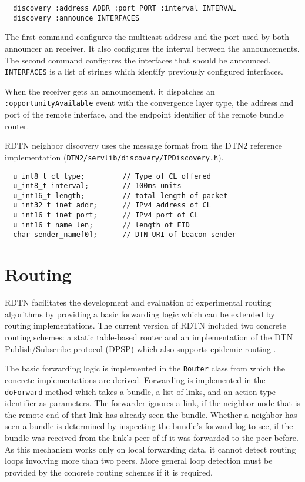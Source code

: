 \documentclass{article}
\begin{document}
\begin{verbatim}
  discovery :address ADDR :port PORT :interval INTERVAL
  discovery :announce INTERFACES
\end{verbatim}

The first command configures the multicast address and the port used by both
announcer an receiver. It also configures the interval between the
announcements.  The second command configures the interfaces that should be
announced.  {\tt INTERFACES} is a list of strings which identify previously
configured interfaces.

When the receiver gets an announcement, it dispatches an {\tt
:opportunityAvailable} event with the convergence layer type, the address and
port of the remote interface, and the endpoint identifier of the remote bundle
router.

RDTN neighbor discovery uses the message format from the DTN2 reference
implementation ({\tt DTN2/servlib/discovery/IPDiscovery.h}).

\begin{verbatim}
  u_int8_t cl_type;         // Type of CL offered
  u_int8_t interval;        // 100ms units
  u_int16_t length;         // total length of packet
  u_int32_t inet_addr;      // IPv4 address of CL
  u_int16_t inet_port;      // IPv4 port of CL
  u_int16_t name_len;       // length of EID
  char sender_name[0];      // DTN URI of beacon sender
\end{verbatim}

\section{Routing}\label{sec.routing}

RDTN facilitates the development and evaluation of experimental routing
algorithms by providing a basic forwarding logic which can be extended by
routing implementations. The current version of RDTN included two concrete
routing schemes: a static table-based router and an implementation of the DTN
Publish/Subscribe protocol (DPSP) \cite{dtn-pubsub} which also supports epidemic
routing \cite{epidemic}.

The basic forwarding logic is implemented in the {\tt Router} class from which
the concrete implementations are derived. Forwarding is implemented in the {\tt
doForward} method which takes a bundle, a list of links, and an action type
identifier as parameters. The forwarder ignores a link, if the neighbor node
that is the remote end of that link has already seen the bundle. Whether a
neighbor has seen a bundle is determined by inspecting the bundle's forward log
to see, if the bundle was received from the link's peer of if it was forwarded
to the peer before. As this mechanism works only on local forwarding data, it
cannot detect routing loops involving more than two peers.  More general loop
detection must be provided by the concrete routing schemes if it is required.
\end{document}
